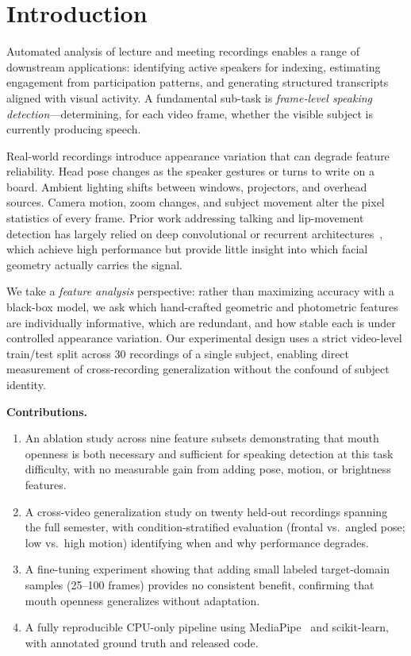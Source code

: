 \documentclass[conference]{IEEEtran}
\begin{document}
\section{Introduction}
\label{sec:intro}

Automated analysis of lecture and meeting recordings enables a range of downstream
applications: identifying active speakers for indexing, estimating engagement from
participation patterns, and generating structured transcripts aligned with visual
activity.
A fundamental sub-task is \emph{frame-level speaking detection}—determining, for
each video frame, whether the visible subject is currently producing speech.

Real-world recordings introduce appearance variation that can degrade feature
reliability.
Head pose changes as the speaker gestures or turns to write on a board.
Ambient lighting shifts between windows, projectors, and overhead sources.
Camera motion, zoom changes, and subject movement alter the pixel statistics of
every frame.
Prior work addressing talking and lip-movement detection has largely relied on
deep convolutional or recurrent architectures~\cite{chung2016out,chung2017lip},
which achieve high performance but provide little insight into which facial
geometry actually carries the signal.

We take a \emph{feature analysis} perspective: rather than maximizing accuracy
with a black-box model, we ask which hand-crafted geometric and photometric
features are individually informative, which are redundant, and how stable
each is under controlled appearance variation.
Our experimental design uses a strict video-level train/test split across
30 recordings of a single subject, enabling direct measurement of
cross-recording generalization without the confound of subject identity.

\textbf{Contributions.}
\begin{enumerate}
  \item An ablation study across nine feature subsets demonstrating that
        mouth openness is both necessary and sufficient for speaking detection
        at this task difficulty, with no measurable gain from adding pose,
        motion, or brightness features.
  \item A cross-video generalization study on twenty held-out recordings spanning
        the full semester, with condition-stratified evaluation (frontal vs.\ angled
        pose; low vs.\ high motion) identifying when and why performance degrades.
  \item A fine-tuning experiment showing that adding small labeled target-domain
        samples (25--100 frames) provides no consistent benefit, confirming that
        mouth openness generalizes without adaptation.
  \item A fully reproducible CPU-only pipeline using MediaPipe~\cite{kartynnik2019realtime}
        and scikit-learn, with annotated ground truth and released code.
\end{enumerate}
\end{document}
